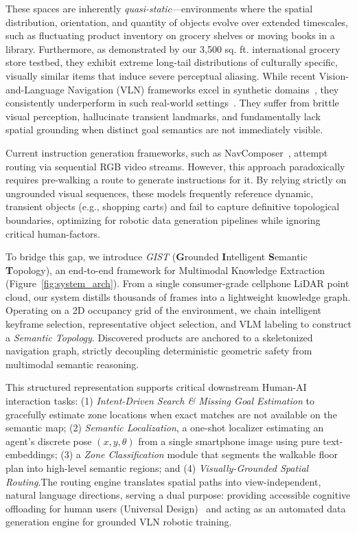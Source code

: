 \documentclass[sigconf,anonymous,review]{acmart}
\begin{document}
These spaces are inherently \emph{quasi-static}—environments where the spatial distribution, orientation, and quantity of objects evolve over extended timescales, such as fluctuating product inventory on grocery shelves or moving books in a library. Furthermore, as demonstrated by our 3,500 sq. ft. international grocery store testbed, they exhibit extreme long-tail distributions of culturally specific, visually similar items that induce severe perceptual aliasing. While recent Vision-and-Language Navigation (VLN) frameworks excel in synthetic domains~\cite{krantz2020vlnce, chen2024mapgpt}, they consistently underperform in such real-world settings~\cite{aghzal2025evaluating, wang2025rethinking, windecker2025navitrace}. They suffer from brittle visual perception, hallucinate transient landmarks, and fundamentally lack spatial grounding when distinct goal semantics are not immediately visible.

Current instruction generation frameworks, such as NavComposer~\cite{he2025navcomposer}, attempt routing via sequential RGB video streams. However, this approach paradoxically requires pre-walking a route to generate instructions for it. By relying strictly on ungrounded visual sequences, these models frequently reference dynamic, transient objects (e.g., shopping carts) and fail to capture definitive topological boundaries, optimizing for robotic data generation pipelines while ignoring critical human-factors.

To bridge this gap, we introduce \emph{GIST} (\textbf{G}rounded \textbf{I}ntelligent \textbf{S}emantic \textbf{T}opology), an end-to-end framework for Multimodal Knowledge Extraction (Figure~\ref{fig:system_arch}). From a single consumer-grade cellphone LiDAR point cloud, our system distills thousands of frames into a lightweight knowledge graph. Operating on a 2D occupancy grid of the environment, we chain intelligent keyframe selection, representative object selection, and VLM labeling to construct a \emph{Semantic Topology}. Discovered products are anchored to a skeletonized navigation graph, strictly decoupling deterministic geometric safety from multimodal semantic reasoning.

This structured representation supports critical downstream Human-AI interaction tasks: (1) \textit{Intent-Driven Search \& Missing Goal Estimation} to gracefully estimate zone locations when exact matches are not available on the semantic map; (2) \textit{Semantic Localization}, a one-shot localizer estimating an agent's discrete pose $(x, y, \theta)$ from a single smartphone image using pure text-embeddings; (3) a \emph{Zone Classification} module that segments the walkable floor plan into high-level semantic regions; and (4) \textit{Visually-Grounded Spatial Routing}.The routing engine translates spatial paths into view-independent, natural language directions, serving a dual purpose: providing accessible cognitive offloading for human users (Universal Design)~\cite{agrawal2023assistive} and acting as an automated data generation engine for grounded VLN robotic training.
\end{document}
